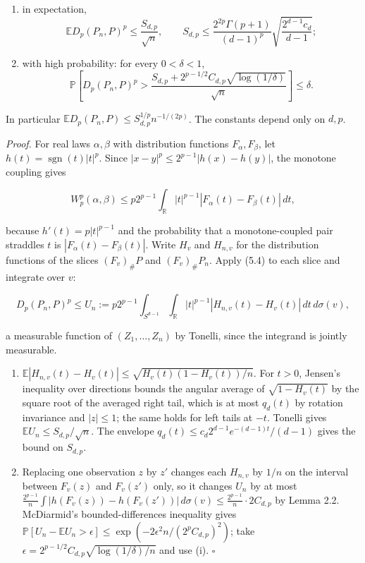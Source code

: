 \documentclass[
  british,
  11pt,
  a4paper,
]{article}
\begin{document}
\begin{enumerate}
\def\labelenumi{(\roman{enumi})}
\item
  in expectation, \[
  \mathbb E D_p(P_n,P)^p\leq\frac{S_{d,p}}{\sqrt n},
  \qquad
  S_{d,p}\leq\frac{2^{2p}\Gamma(p+1)}{(d-1)^p}\sqrt{\frac{2^{d-1}c_d}{d-1}};
  \tag{5.2}
  \]
\item
  with high probability: for every \(0<\delta<1\), \[
  \mathbb P\!\left[D_p(P_n,P)^p>\frac{S_{d,p}+2^{p-1/2}C_{d,p}\sqrt{\log(1/\delta)}}{\sqrt n}\right]\leq\delta .
  \tag{5.3}
  \]
\end{enumerate}

In particular \(\mathbb E D_p(P_n,P)\leq S_{d,p}^{1/p}n^{-1/(2p)}\). The
constants depend only on \(d,p\).

\emph{Proof.} For real laws \(\alpha,\beta\) with distribution functions
\(F_\alpha,F_\beta\), let \(h(t)=\operatorname{sgn}(t)|t|^p\). Since
\(|x-y|^p\leq2^{p-1}|h(x)-h(y)|\), the monotone coupling gives

\[
W_p^p(\alpha,\beta)
\leq p2^{p-1}\int_{\mathbb R}|t|^{p-1}|F_\alpha(t)-F_\beta(t)|\,dt,
\tag{5.4}
\]

because \(h'(t)=p|t|^{p-1}\) and the probability that a monotone-coupled
pair straddles \(t\) is \(|F_\alpha(t)-F_\beta(t)|\). Write \(H_v\) and
\(H_{n,v}\) for the distribution functions of the slices \((F_v)_\#P\)
and \((F_v)_\#P_n\). Apply (5.4) to each slice and integrate over \(v\):

\[
D_p(P_n,P)^p\leq U_n:=p2^{p-1}\int_{S^{d-1}}\int_{\mathbb R}|t|^{p-1}|H_{n,v}(t)-H_v(t)|\,dt\,d\sigma(v),
\]

a measurable function of \((Z_1,\ldots,Z_n)\) by Tonelli, since the
integrand is jointly measurable.

\begin{enumerate}
\def\labelenumi{(\roman{enumi})}
\item
  \(\mathbb E|H_{n,v}(t)-H_v(t)|\leq\sqrt{H_v(t)(1-H_v(t))/n}\). For
  \(t>0\), Jensen's inequality over directions bounds the angular
  average of \(\sqrt{1-H_v(t)}\) by the square root of the averaged
  right tail, which is at most \(q_d(t)\) by rotation invariance and
  \(|z|\leq1\); the same holds for left tails at \(-t\). Tonelli gives
  \(\mathbb EU_n\leq S_{d,p}/\sqrt n\). The envelope
  \(q_d(t)\leq c_d2^{d-1}e^{-(d-1)t}/(d-1)\) gives the bound on
  \(S_{d,p}\).
\item
  Replacing one observation \(z\) by \(z'\) changes each \(H_{n,v}\) by
  \(1/n\) on the interval between \(F_v(z)\) and \(F_v(z')\) only, so it
  changes \(U_n\) by at most
  \(\frac{2^{p-1}}n\int|h(F_v(z))-h(F_v(z'))|\,d\sigma(v)\leq\frac{2^{p-1}}{n}\cdot2C_{d,p}\)
  by Lemma 2.2. McDiarmid's bounded-differences inequality
  \citep{McDiarmid1989} gives
  \(\mathbb P[U_n-\mathbb EU_n>\epsilon]\leq\exp(-2\epsilon^2n/(2^pC_{d,p})^2)\);
  take \(\epsilon=2^{p-1/2}C_{d,p}\sqrt{\log(1/\delta)/n}\) and use (i).
  \(\square\)
\end{enumerate}
\end{document}
